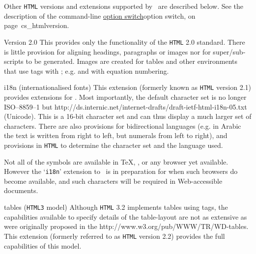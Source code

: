 \medskip\noindent
Other \texttt{HTML} versions and extensions 
supported by \latextohtml\ are described below.
See the description of the  command-line
\hyperref[page]{option switch}{option switch, on page~}{}{cs_htmlversion}.
%
\begin{htmllist}
\addtolength{\leftskip}{15pt}
%
\item[Version 2.0\label{html20}]
This provides only the functionality of the \texttt{HTML} 2.0 standard.
There is little provision for aligning headings, paragraphs or images
nor for super/sub-scripts to be generated. Images are created for tables 
and other environments that use  tags with \HTMLiii;
e.g.  and  with equation numbering.

%
%
%
%
%
%
%
\item[i18n (internationalised fonts) \strikeout{Version 2.1}]
This extension (formerly known as \texttt{HTML} version 2.1)
provides extensions for .
Most importantly, the default character set is no longer ISO--8859--1 
but %
{http://ds.internic.net/internet-drafts/draft-ietf-html-i18n-05.txt} (Unicode).
This is a 16-bit character set and can thus display a much larger set of characters.
There are also provisions for bidirectional languages 
(e.g. in Arabic the text is written from right to left, 
but numerals from left to right), and provisions in \texttt{HTML} 
to determine the character set and the language used.

Not all of the symbols are available in \TeX, \latextohtml, 
or any browser yet available.  
However the `\texttt{i18n}' extension to \latextohtml\ is in preparation
for when such browsers do become available, and such characters
will be required in Web-accessible documents. 


%
%
%
%
\item[tables (\texttt{HTML3} model)\label{tables3}\strikeout{Version 2.2}]
Although \texttt{HTML} 3.2 implements tables using  tags,
the capabilities available to specify details of the table-layout
are not as extensive as were originally proposed in the
%
{http://www.w3.org/pub/WWW/TR/WD-tables}.
This extension (formerly referred to as \texttt{HTML} version 2.2)
provides the full capabilities of this model.


\end{htmllist}
